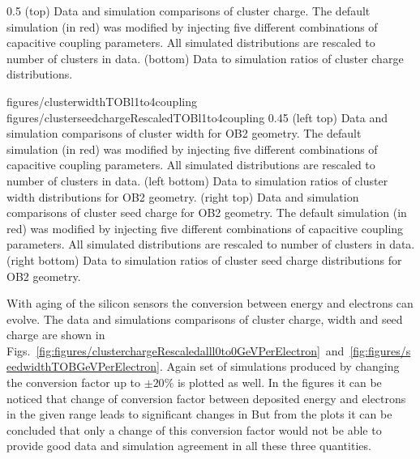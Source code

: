                  {0.5}       %
                 { (top) Data and simulation comparisons of cluster charge. The default simulation (in red) was modified by injecting five different combinations of capacitive coupling parameters. All simulated distributions are rescaled to number of clusters in data. (bottom) Data to simulation ratios of cluster charge distributions. }

                 {figures/clusterwidthTOBl1to4coupling}
                 {figures/clusterseedchargeRescaledTOBl1to4coupling} %
                 {0.45}       %
                 {(left top) Data and simulation comparisons of cluster width for OB2 geometry. The default simulation (in red) was modified by injecting five different combinations of capacitive coupling parameters. All simulated distributions are rescaled to number of clusters in data. (left bottom) Data to simulation ratios of cluster width distributions for OB2 geometry. (right top) Data and simulation  comparisons of cluster seed charge for OB2 geometry. The default simulation (in red) was modified by injecting five different combinations of capacitive coupling parameters. All simulated distributions are rescaled to number of clusters in data. (right bottom) Data to simulation ratios of cluster seed charge distributions for OB2 geometry. }


With aging of the silicon sensors the conversion between energy and electrons can evolve. The data and simulations comparisons of cluster charge, width and seed charge are shown in Figs.~\ref{fig:figures/clusterchargeRescaledalll0to0GeVPerElectron}~and~\ref{fig:figures/seedwidthTOBGeVPerElectron}. Again set of simulations produced by changing the conversion factor up to $\pm 20\%$ is plotted as well. In the figures it can be noticed that change of conversion factor between deposited energy and electrons in the given range leads to significant changes in  But from the plots it can be concluded that only a change of this conversion factor would not be able to provide good data and simulation agreement in all these three quantities.

